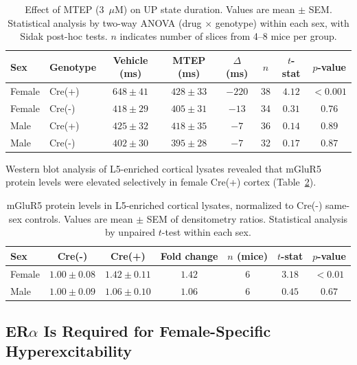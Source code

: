 \documentclass[11pt]{article}
\begin{document}
\begin{table}[H]
\centering
\caption{Effect of MTEP (3~$\mu$M) on UP state duration. Values are mean $\pm$ SEM. Statistical analysis by two-way ANOVA (drug $\times$ genotype) within each sex, with Sidak post-hoc tests. $n$ indicates number of slices from 4--8 mice per group.}
\label{tab:mtep}
\begin{tabular}{llcccccc}
\toprule
\textbf{Sex} & \textbf{Genotype} & \textbf{Vehicle (ms)} & \textbf{MTEP (ms)} & \textbf{$\Delta$ (ms)} & \textbf{$n$} & \textbf{$t$-stat} & \textbf{$p$-value} \\
\midrule
Female & Cre(+) & $648 \pm 41$ & $428 \pm 33$ & $-220$ & 38 & $4.12$ & $< 0.001$ \\
Female & Cre(-) & $418 \pm 29$ & $405 \pm 31$ & $-13$ & 34 & $0.31$ & $0.76$ \\
Male & Cre(+) & $425 \pm 32$ & $418 \pm 35$ & $-7$ & 36 & $0.14$ & $0.89$ \\
Male & Cre(-) & $402 \pm 30$ & $395 \pm 28$ & $-7$ & 32 & $0.17$ & $0.87$ \\
\bottomrule
\end{tabular}
\end{table}

Western blot analysis of L5-enriched cortical lysates revealed that mGluR5 protein levels were elevated selectively in female Cre(+) cortex (Table~\ref{tab:mglur5_protein}).

\begin{table}[H]
\centering
\caption{mGluR5 protein levels in L5-enriched cortical lysates, normalized to Cre(-) same-sex controls. Values are mean $\pm$ SEM of densitometry ratios. Statistical analysis by unpaired $t$-test within each sex.}
\label{tab:mglur5_protein}
\begin{tabular}{lcccccc}
\toprule
\textbf{Sex} & \textbf{Cre(-)} & \textbf{Cre(+)} & \textbf{Fold change} & \textbf{$n$ (mice)} & \textbf{$t$-stat} & \textbf{$p$-value} \\
\midrule
Female & $1.00 \pm 0.08$ & $1.42 \pm 0.11$ & $1.42$ & $6$ & $3.18$ & $< 0.01$ \\
Male & $1.00 \pm 0.09$ & $1.06 \pm 0.10$ & $1.06$ & $6$ & $0.45$ & $0.67$ \\
\bottomrule
\end{tabular}
\end{table}

\subsection{ER$\alpha$ Is Required for Female-Specific Hyperexcitability}
\end{document}
